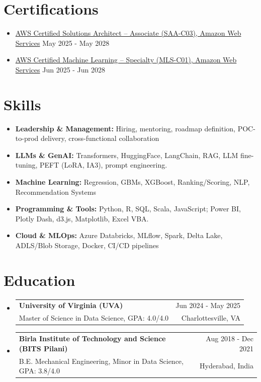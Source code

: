 \documentclass[letterpaper,11pt]{article}
\makeatletter
\newcommand{\resumeItem}[1]{\item{\small{#1}}}
\newcommand{\resumeeduSubheading}[4]{
  \item
    \begin{tabular*}{1\textwidth}{l@{\extracolsep{\fill}}r}
      \textbf{\large{#1}} & {\small{#4}} \\
      {{\small{#3}}} & {{\small{#2}}}
    \end{tabular*}
  \vspace{-0.4cm}
}
\newcommand{\resumeSubHeadingListStart}{\begin{itemize}[leftmargin=0.0in, label={}]}
\newcommand{\resumeSubHeadingListEnd}{\end{itemize}}
\newcommand{\resumeItemListStart}{\vspace{-1pt}\begin{itemize}[leftmargin=0.18in, label=\textbullet]}
\newcommand{\resumeItemListEnd}{\end{itemize}}
\makeatother
\begin{document}
\section{Certifications}
\resumeItemListStart
\resumeItem{
\href{\salink}{{AWS Certified Solutions Architect – Associate (SAA-C03), Amazon Web Services}} 
\hfill{May 2025 - May 2028}}\vspace{-7pt}
\resumeItem{
\href{\mllink}{{AWS Certified Machine Learning – Specialty (MLS-C01), Amazon Web Services}} 
\hfill{Jun 2025 - Jun 2028}}
\resumeItemListEnd
\vspace{-21pt}

\section{Skills}
\begin{itemize}[leftmargin=0.00in, label={}, itemsep=1px, parsep=0pt]
\item{\textbf{Leadership \& Management:} Hiring, mentoring, roadmap definition, POC-to-prod delivery, cross-functional collaboration}
\item{\textbf{LLMs \& GenAI:} Transformers, HuggingFace, LangChain, RAG, LLM fine-tuning, PEFT (LoRA, IA3), prompt engineering.}
\item{\textbf{Machine Learning:} Regression, GBMs, XGBoost, Ranking/Scoring, NLP, Recommendation Systems}
\item{\textbf{Programming \& Tools:} Python, R, SQL, Scala, JavaScript; Power BI, Plotly Dash, d3.js, Matplotlib, Excel VBA.}
\item{\textbf{Cloud \& MLOps:} Azure Databricks, MLflow, Spark, Delta Lake, ADLS/Blob Storage, Docker, CI/CD pipelines}
\end{itemize}
\vspace{-18pt}

\section{Education}
\resumeSubHeadingListStart
\resumeeduSubheading
    {University of Virginia {(UVA)}}
    {Charlottesville, VA}
    {Master of Science in Data Science, GPA: 4.0/4.0}
    {Jun 2024 - May 2025}
\vspace{10pt}
\resumeeduSubheading
    {Birla Institute of Technology and Science (BITS Pilani)}
    {Hyderabad, India}
    {B.E. Mechanical Engineering, Minor in Data Science, GPA: 3.8/4.0}
    {Aug 2018 - Dec 2021}
\resumeSubHeadingListEnd
\end{document}
